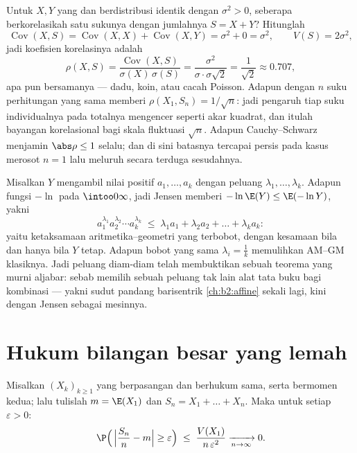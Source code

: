 \begin{example}\label{ex:b2:randomvar:partwhole}
Untuk $X, Y$ yang  dan berdistribusi identik dengan 
$\sigma^2 > 0$, seberapa berkorelasikah satu sukunya dengan jumlahnya
$S = X + Y$? Hitunglah
\[
\operatorname{Cov}(X, S) = \operatorname{Cov}(X, X) +
\operatorname{Cov}(X, Y) = \sigma^2 + 0 = \sigma^2,
\qquad V(S) = 2\sigma^2,
\]
jadi koefisien korelasinya adalah
\[
\rho(X, S) = \frac{\operatorname{Cov}(X,
S)}{\sigma(X)\,\sigma(S)}
= \frac{\sigma^2}{\sigma\cdot\sigma\sqrt2}
= \frac{1}{\sqrt2} \approx 0.707 ,
\]
apa pun  bersamanya --- dadu, koin, atau cacah Poisson. Adapun dengan
$n$ suku perhitungan yang sama memberi $\rho(X_1, S_n) =
1/\sqrt n$: jadi pengaruh tiap suku individualnya pada totalnya
mengencer seperti akar kuadrat, dan itulah bayangan korelasional
bagi skala fluktuasi $\sqrt n$. Adapun Cauchy--Schwarz
menjamin $\abs\rho \leq 1$ selalu; dan di sini batasnya tercapai
persis pada kasus merosot $n = 1$ lalu meluruh secara terduga
sesudahnya.
\end{example}

\begin{example}\label{ex:b2:randomvar:amgm}
Misalkan $Y$ mengambil nilai positif $a_1, \dots, a_k$ dengan
peluang $\lambda_1, \dots, \lambda_k$. Adapun fungsi
$-\ln$  pada $\intoo0\infty$, jadi Jensen memberi
$-\ln\E(Y) \leq \E(-\ln Y)$, yakni
\[
a_1^{\lambda_1}a_2^{\lambda_2}\cdots a_k^{\lambda_k}
\;\leq\; \lambda_1a_1 + \lambda_2a_2 + \dots + \lambda_ka_k :
\]
yaitu ketaksamaan aritmetika--geometri yang terbobot, dengan kesamaan
bila dan hanya bila $Y$ tetap. Adapun bobot yang sama $\lambda_i = \frac1k$
memulihkan AM--GM klasiknya. Jadi peluang diam-diam telah membuktikan
sebuah teorema yang murni aljabar: sebab memilih sebuah  peluang
tak lain alat tata buku bagi kombinasi  --- yakni
sudut pandang barisentrik \cref{ch:b2:affine} sekali lagi, kini
dengan Jensen sebagai mesinnya.
\end{example}

\section{Hukum bilangan besar yang lemah}

\begin{theorem}\label{thm:b2:randomvar:lln}
Misalkan $(X_k)_{k \geq 1}$  yang  berpasangan
dan berhukum sama, serta bermomen kedua; lalu tulislah $m = \E(X_1)$
dan $S_n = X_1 + \dots + X_n$. Maka untuk setiap $\varepsilon > 0$:
\[
\P\Bigl(\,\Bigl|\frac{S_n}{n} - m\Bigr| \geq \varepsilon\Bigr)
\;\leq\; \frac{V(X_1)}{n\,\varepsilon^2}
\xrightarrow[n \to \infty]{} 0 .
\]
\end{theorem}

